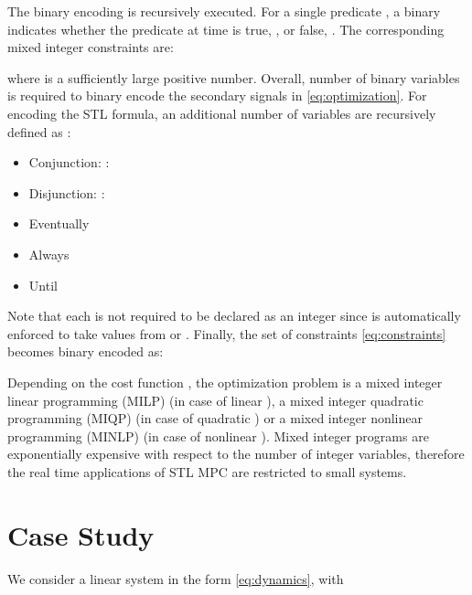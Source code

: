 \documentclass[letterpaper, 10 pt, conference]{ieeeconf}
\begin{document}
The binary encoding is recursively executed. For a single predicate , a binary  indicates whether the predicate at time  is true, , or false, . The corresponding mixed integer constraints are:

where  is a sufficiently large positive number. Overall,  number of binary variables is required to binary encode the secondary signals in \eqref{eq:optimization}. 
For encoding the STL formula, an additional number of variables are recursively defined as \cite{raman}:
\begin{itemize}
\item Conjunction: :

\item Disjunction: :

\end{itemize}

\begin{itemize}
\item Eventually 

\item Always 

\item Until 

\end{itemize}
Note that each  is not required to be declared as an integer since is automatically enforced to take values from  or . Finally, the set of constraints \eqref{eq:constraints} becomes binary encoded as:

Depending on the cost function , the optimization problem is a mixed integer linear programming (MILP) (in case of linear ), a mixed integer quadratic programming (MIQP) (in case of quadratic ) or a mixed integer nonlinear programming (MINLP) (in case of nonlinear ). Mixed integer programs are exponentially expensive with respect to the number of integer variables, therefore the real time applications of STL MPC are restricted to small systems.

 

















\section{Case Study}
\label{sec:case}
We consider a linear system in the form \eqref{eq:dynamics}, with 
\end{document}
